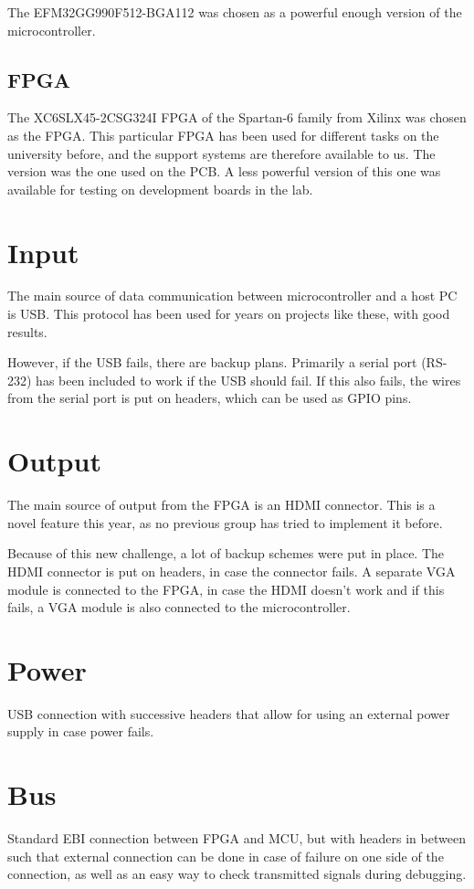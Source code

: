 \documentclass[../main/report.tex]{subfiles}
\begin{document}
The EFM32GG990F512-BGA112 was chosen as a powerful enough version of the microcontroller.

\subsection{FPGA}
The XC6SLX45-2CSG324I FPGA of the Spartan-6 family from Xilinx was chosen as the FPGA.
This particular FPGA has been used for different tasks on the university before, and the support systems are therefore available to us.
The version was the one used on the PCB.
A less powerful version of this one was available for testing on development boards in the lab.

\section{Input}

The main source of data communication between microcontroller and a host PC is USB.
This protocol has been used for years on projects like these, with good results. 

However, if the USB fails, there are backup plans.
Primarily a serial port (RS-232) has been included to work if the USB should fail.
If this also fails, the wires from the serial port is put on headers, which can be used as GPIO pins.

\section{Output}
The main source of output from the FPGA is an HDMI connector.
This is a novel feature this year, as no previous group has tried to implement it before.

Because of this new challenge, a lot of backup schemes were put in place.
The HDMI connector is put on headers, in case the connector fails.
A separate VGA module is connected to the FPGA, in case the HDMI doesn't work and if this fails, a VGA module is also connected to the microcontroller.

\section{Power}
USB connection with successive headers that allow for using an external power supply in case power fails.

\section{Bus}
Standard EBI connection between FPGA and MCU, but with headers in between such that external connection can be done in case of failure on one side of the connection, as well as an easy way to check transmitted signals during debugging.
\end{document}
